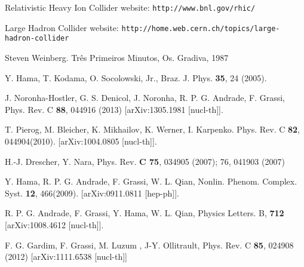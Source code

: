 \documentclass[a4paper,12pt]{article}
\begin{document}
\begin{thebibliography}{99}

Relativistic Heavy Ion Collider website: \verb#http://www.bnl.gov/rhic/#

Large Hadron Collider website: \verb#http://home.web.cern.ch/topics/large-hadron-collider#

Steven Weinberg. Três Primeiros Minutos, Os. Gradiva, 1987

Y. Hama, T. Kodama, O. Socolowski, Jr., Braz. J. Phys. \textbf{35}, 24 (2005).

J. Noronha-Hostler, G. S. Denicol, J. Noronha, R. P. G. Andrade, F. Grassi, Phys. Rev. C \textbf{88}, 044916 (2013) [arXiv:1305.1981 [nucl-th]].




T. Pierog, M. Bleicher, K. Mikhailov, K. Werner, I. Karpenko. Phys. Rev. C \textbf{82}, 044904(2010). [arXiv:1004.0805 [nucl-th]].

H.-J. Drescher, Y. Nara, Phys. Rev. \textbf{C 75}, 034905 (2007); 76, 041903 (2007)

Y. Hama, R. P. G. Andrade, F. Grassi, W. L. Qian, Nonlin. Phenom. Complex. Syst. \textbf{12}, 466(2009). [arXiv:0911.0811 [hep-ph]].

R. P. G. Andrade, F. Grassi, Y. Hama, W. L. Qian, Physics Letters. B, \textbf{712} [arXiv:1008.4612 [nucl-th]].

F. G. Gardim, F. Grassi, M. Luzum , J-Y. Ollitrault, Phys. Rev. C \textbf{85}, 024908 (2012) [arXiv:1111.6538 [nucl-th]]




\end{thebibliography}
\end{document}
